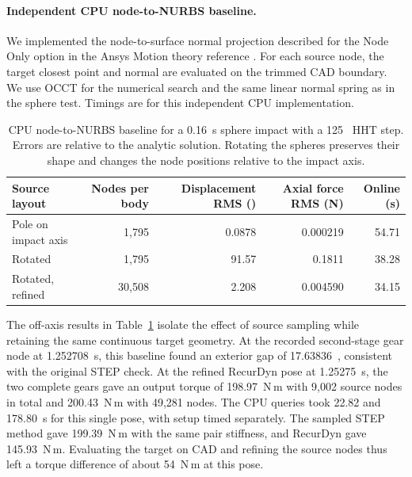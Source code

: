 \paragraph{Independent CPU node-to-NURBS baseline.}
We implemented the node-to-surface normal projection described for the Node Only option in the Ansys Motion theory reference \citep{ansysmotion2025nurbs}. For each source node, the target closest point and normal are evaluated on the trimmed CAD boundary. We use OCCT for the numerical search and the same linear normal spring as in the sphere test. Timings are for this independent CPU implementation.

\begin{table}[pos=!htbp]\small\centering
\caption{CPU node-to-NURBS baseline for a 0.16~s sphere impact with a 125~\microsec{} HHT step. Errors are relative to the analytic solution. Rotating the spheres preserves their shape and changes the node positions relative to the impact axis.}
\label{tab:nurbs-node-baseline}
\begin{tabular}{lrrrr}\toprule
Source layout & Nodes per body & Displacement RMS (\micron{}) & Axial force RMS (N) & Online (s)\\\midrule
Pole on impact axis & 1,795 & 0.0878 & 0.000219 & 54.71\\
Rotated             & 1,795 & 91.57  & 0.1811   & 38.28\\
Rotated, refined    & 30,508 & 2.208 & 0.004590 & 34.15\\\bottomrule
\end{tabular}
\end{table}

The off-axis results in Table~\ref{tab:nurbs-node-baseline} isolate the effect of source sampling while retaining the same continuous target geometry. At the recorded second-stage gear node at 1.252708~s, this baseline found an exterior gap of 17.63836~\micron{}, consistent with the original STEP check.
At the refined RecurDyn pose at 1.25275~s, the two complete gears gave an output torque of 198.97~N\,m with 9,002 source nodes in total and 200.43~N\,m with 49,281 nodes. The CPU queries took 22.82 and 178.80~s for this single pose, with setup timed separately. The sampled STEP method gave 199.39~N\,m with the same pair stiffness, and RecurDyn gave 145.93~N\,m. Evaluating the target on CAD and refining the source nodes thus left a torque difference of about 54~N\,m at this pose.
\FloatBarrier
